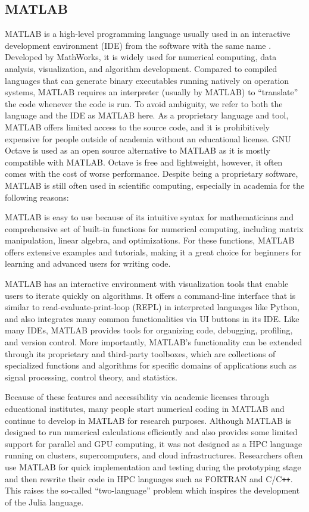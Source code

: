 \subsection{MATLAB}
MATLAB is a high-level programming language usually used in an interactive development environment (IDE) from the software with the same name \citep{doi:10.1137/1.9781611974669}.
Developed by MathWorks, it is widely used for numerical computing, data analysis, visualization, and algorithm development.
Compared to compiled languages that can generate binary executables running natively on operation systems, MATLAB requires an interpreter (usually by MATLAB) to ``translate'' the code whenever the code is run.
To avoid ambiguity, we refer to both the language and the IDE as MATLAB here.
As a proprietary language and tool, MATLAB offers limited access to the source code, and it is prohibitively expensive for people outside of academia without an educational license.
GNU Octave is used as an open source alternative to MATLAB as it is mostly compatible with MATLAB. Octave is free and lightweight, however, it often comes with the cost of worse performance.
Despite being a proprietary software, MATLAB is still often used in scientific computing, especially in academia for the following reasons:

MATLAB is easy to use because of its intuitive syntax for mathematicians and comprehensive set of built-in functions for numerical computing, including matrix manipulation, linear algebra, and optimizations. For these functions, MATLAB offers extensive examples and tutorials, making it a great choice for beginners for learning and advanced users for writing code.

MATLAB has an interactive environment with visualization tools that enable users to iterate quickly on algorithms. It offers a command-line interface that is similar to read-evaluate-print-loop (REPL) in interpreted languages like Python, and also integrates many common functionalities via UI buttons in its IDE.
Like many IDEs, MATLAB provides tools for organizing code, debugging, profiling, and version control.
More importantly, MATLAB's functionality can be extended through its proprietary and third-party toolboxes, which are collections of specialized functions and algorithms for specific domains of applications such as signal processing, control theory, and statistics.

Because of these features and accessibility via academic licenses through educational institutes, many people start numerical coding in MATLAB and continue to develop in MATLAB for research purposes. 
Although MATLAB is designed to run numerical calculations efficiently and also provides some limited support for parallel and GPU computing, it was not designed as a HPC language running on clusters, supercomputers, and cloud infrastructures. 
Researchers often use MATLAB for quick implementation and testing during the prototyping stage and then rewrite their code in HPC languages such as FORTRAN and C/C\texttt{++}. 
This raises the so-called ``two-language'' problem which inspires the development of the Julia language.

